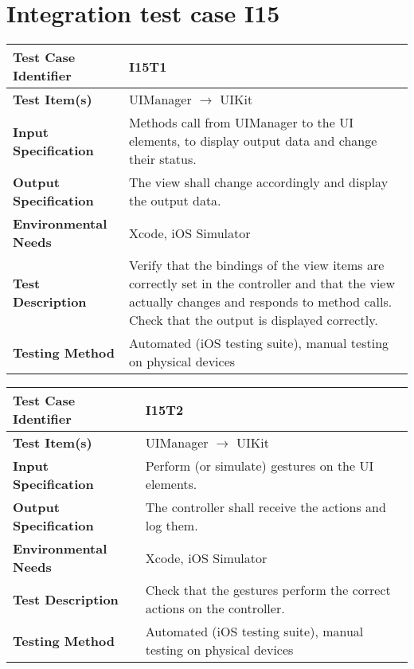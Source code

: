 \vspace{2em}

\section{Integration test case I15}

\begin{tabular}{l p{}}
    \hline
    \textbf{Test Case Identifier} & I15T1\\
    \hline
    \textbf{Test Item(s)} & UIManager $\rightarrow$ UIKit \\
    \hline
    \textbf{Input Specification} & Methods call from UIManager to the UI elements, to display output data and change their status.\\
    \hline
    \textbf{Output Specification} & The view shall change accordingly and display the output data.\\
    \hline
    \textbf{Environmental Needs} & Xcode, iOS Simulator\\
    \hline
    \textbf{Test Description} & Verify that the bindings of the view items are correctly set in the controller and that the view actually changes and responds to method calls. Check that the output is displayed correctly.\\
    \hline
    \textbf{Testing Method} & Automated (iOS testing suite), manual testing on physical devices \\
    \hline
\end{tabular}

\vspace{2em}

\noindent\begin{tabular}{l p{}}
    \hline
    \textbf{Test Case Identifier} & I15T2\\
    \hline
    \textbf{Test Item(s)} & UIManager $\rightarrow$ UIKit \\
    \hline
    \textbf{Input Specification} & Perform (or simulate) gestures on the UI elements.\\
    \hline
    \textbf{Output Specification} & The controller shall receive the actions and log them. \\
    \hline
    \textbf{Environmental Needs} & Xcode, iOS Simulator\\
    \hline
    \textbf{Test Description} & Check that the gestures perform the correct actions on the controller.\\
    \hline
    \textbf{Testing Method} & Automated (iOS testing suite), manual testing on physical devices \\
    \hline
\end{tabular}

